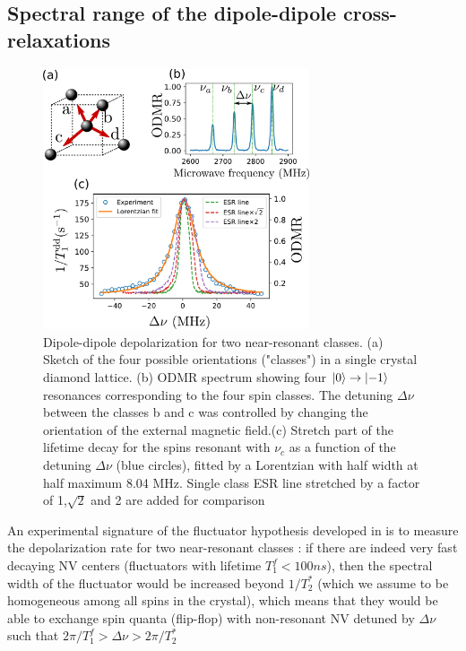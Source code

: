 \documentclass[preprintnumbers,amsmath,amssymb,onecolumn,12pt]{revtex4-2}
\begin{document}
\subsection{Spectral range of the dipole-dipole cross-relaxations}
\label{fluctuator width}
\begin{figure}
\includegraphics[width=0.7\textwidth]{Figures_SI/largeur_fluct_SI}
\caption{Dipole-dipole depolarization for two near-resonant classes. (a) Sketch of the four possible orientations ("classes") in a single crystal diamond lattice. (b) ODMR spectrum showing four $\ket{0} \to \ket{-1}$ resonances corresponding to the four spin classes. The detuning $\Delta \nu$ between the classes b and c was controlled by changing the orientation of the external magnetic field.(c) Stretch part of the lifetime decay for the spins resonant with $\nu_c$ as a function of the detuning $\Delta \nu$ (blue circles), fitted by a Lorentzian with half width at half maximum 8.04 MHz. Single class ESR line stretched by a factor of 1,$\sqrt{2}$ and 2 are added for comparison}
\label{largeur_fluct}
\end{figure}

An experimental signature of the fluctuator hypothesis developed in \cite{choi_depolarization_2017} is to measure the depolarization rate for two near-resonant classes : if there are indeed very fast decaying NV centers (fluctuators with lifetime $T_1^f < 100 ns$), then the spectral width of the fluctuator would be increased beyond $1/T_2^*$ (which we assume to be homogeneous among all spins in the crystal), which means that they would be able to exchange spin quanta (flip-flop) with non-resonant NV detuned by $\Delta \nu$ such that $2\pi/T_1^f > \Delta \nu > 2\pi/T_2^*$
\end{document}
